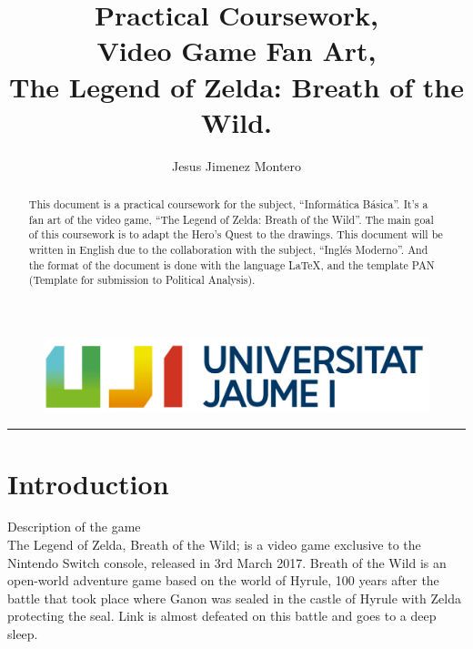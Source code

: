 \documentclass{cup-pan}
\title{Practical Coursework,\\ Video Game Fan Art, \\ The Legend of Zelda: Breath of the Wild.}
\author{Jesus Jimenez Montero}
\affil[1] {Informática Básica, VJ1202}
\affil[2] {Expresión Artística, VJ1204}
\affil[3] {Inglés Moderno, VJ1205}
\begin{document}
\maketitle
\begin{figure}[H]
    \includegraphics[width=\textwidth]{Imagenes/uanl (1).jpg}
\end{figure}
\textcolor{PANDarkBlue}{\hrule}

\medskip
%

\newpage
\tableofcontents
\newpage
\listoffigures
\newpage

\begin{abstract}
    This document is a practical coursework for the subject, “Informática Básica”. It's a fan art of the video game, “The Legend of Zelda: Breath of the Wild”. The main goal of this coursework is to adapt the Hero's Quest to the drawings.
    This document will be written in English due to the collaboration with the subject, “Inglés Moderno”. 
    And the format of the document is done with the language LaTeX, and the template PAN (Template for submission to Political Analysis).
\end{abstract}


\section{Introduction}

    \textcolor{PANDarkBlue}{\large Description of the game}\\
    
    The Legend of Zelda, Breath of the Wild; is a video game exclusive to the Nintendo Switch console, released in 3rd March 2017. 
    Breath of the Wild is an open-world adventure game based on the world of Hyrule, 100 years after the battle that took place where Ganon was sealed in the castle of Hyrule with Zelda protecting the seal. Link is almost defeated on this battle and goes to a deep sleep.
    
\end{document}
